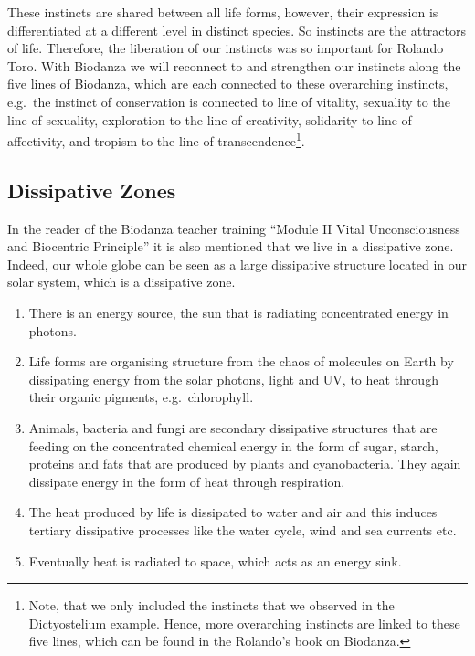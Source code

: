 \documentclass[
  11pt,
]{book}
\begin{document}
These instincts are shared between all life forms, however, their expression is differentiated at a different level in distinct species. So instincts are the attractors of life. Therefore, the liberation of our instincts was so important for Rolando Toro. With Biodanza we will reconnect to and strengthen our instincts along the five lines of Biodanza, which are each connected to these overarching instincts, e.g.~the instinct of conservation is connected to line of vitality, sexuality to the line of sexuality, exploration to the line of creativity, solidarity to line of affectivity, and tropism to the line of transcendence\footnote{Note, that we only included the instincts that we observed in the Dictyostelium example. Hence, more overarching instincts are linked to these five lines, which can be found in the Rolando's book on Biodanza.}.

\hypertarget{dissipative-zones}{%
\subsection{Dissipative Zones}\label{dissipative-zones}}

In the reader of the Biodanza teacher training ``Module II Vital Unconsciousness and Biocentric Principle'' it is also mentioned that we live in a dissipative zone. Indeed, our whole globe can be seen as a large dissipative structure located in our solar system, which is a dissipative zone.

\begin{enumerate}
\def\labelenumi{\arabic{enumi}.}
\item
  There is an energy source, the sun that is radiating concentrated energy in photons.
\item
  Life forms are organising structure from the chaos of molecules on Earth by dissipating energy from the solar photons, light and UV, to heat through their organic pigments, e.g.~chlorophyll.
\item
  Animals, bacteria and fungi are secondary dissipative structures that are feeding on the concentrated chemical energy in the form of sugar, starch, proteins and fats that are produced by plants and cyanobacteria. They again dissipate energy in the form of heat through respiration.
\item
  The heat produced by life is dissipated to water and air and this induces tertiary dissipative processes like the water cycle, wind and sea currents etc.
\item
  Eventually heat is radiated to space, which acts as an energy sink.
\end{enumerate}
\end{document}
